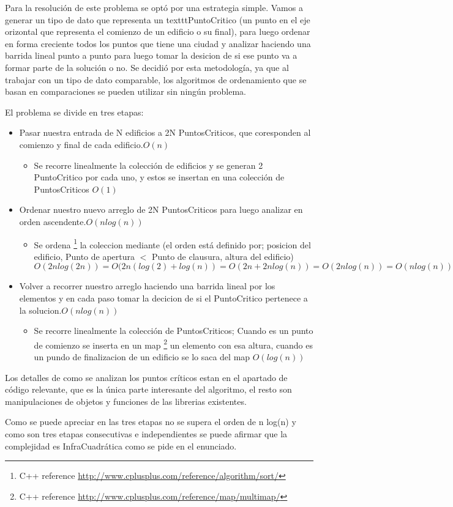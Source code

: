 Para la resolución de este problema se optó por una estrategia simple. Vamos a generar un tipo de dato que representa un texttt{PuntoCritico} (un punto en el eje orizontal que representa el comienzo de un edificio o su final), para luego ordenar en forma creciente todos los puntos que tiene una ciudad y analizar haciendo una barrida lineal punto a punto para luego tomar la desicion de si ese punto va a formar parte de la solución o no.
Se decidió por esta metodología, ya que al trabajar con un tipo de dato comparable, los algoritmos de ordenamiento que se basan en comparaciones se pueden utilizar sin ningún problema.

El problema se divide en tres etapas:

\begin{itemize}
	\item Pasar nuestra entrada de N edificios a 2N PuntosCriticos, que coresponden al comienzo y final de cada edificio.$O(n)$
		\begin{itemize}
		\item  Se recorre linealmente la colección de edificios y se generan 2 PuntoCritico por cada uno, y estos se insertan en una colección de PuntosCriticos $O(1)$
		\end{itemize}
	\item Ordenar nuestro nuevo arreglo de 2N PuntosCriticos para luego analizar en orden ascendente.$O(n log(n))$
		\begin{itemize}
		\item  Se ordena \footnote{C++ reference \url{http://www.cplusplus.com/reference/algorithm/sort/}} la coleccion mediante (el orden está definido por; posicion del edificio, Punto de apertura $<$ Punto de clausura, altura del edificio)\\
			$O(2n log(2n)) = O(2n (log(2) + log(n)) = O(2n + 2n log(n)) = O(2n log(n)) = O(n log(n))$
		\end{itemize}
	\item Volver a recorrer nuestro arreglo haciendo una barrida lineal por los elementos y en cada paso tomar la decicion de si el PuntoCritico pertenece a la solucion.$O(n log(n))$
	\begin{itemize}
		\item  Se recorre linealmente la colección de PuntosCriticos; Cuando es un punto de comienzo se inserta en un map 
		\footnote{C++ reference \url{http://www.cplusplus.com/reference/map/multimap/}}  un elemento con esa altura, cuando es un pundo de finalizacion de un edificio se lo saca del map $O(log(n))$
		\end{itemize}
\end{itemize}

Los detalles de como se analizan los puntos críticos estan en el apartado de código relevante, que es la única parte interesante del algoritmo, el resto son manipulaciones de objetos y funciones de las librerias existentes.

Como se puede apreciar en las tres etapas no se supera el orden de n log(n) y como son tres etapas consecutivas e independientes se puede afirmar que la complejidad es InfraCuadrática como se pide en el enunciado.



